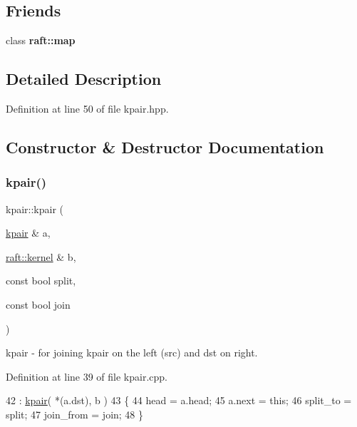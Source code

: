 \subsection*{Friends}
\begin{DoxyCompactItemize}
\item 
\hypertarget{classkpair_aa25a3986fa3c9242f434168844d4ddfb}{}\label{classkpair_aa25a3986fa3c9242f434168844d4ddfb} 
class {\bfseries raft\+::map}
\end{DoxyCompactItemize}


\subsection{Detailed Description}


Definition at line 50 of file kpair.\+hpp.



\subsection{Constructor \& Destructor Documentation}
\hypertarget{classkpair_a5a1866af1277df07ee28df5e87a91b24}{}\label{classkpair_a5a1866af1277df07ee28df5e87a91b24} 
\subsubsection{\texorpdfstring{kpair()}{kpair()}\hspace{0.1cm}{\footnotesize\ttfamily [1/3]}}
{\footnotesize\ttfamily kpair\+::kpair (\begin{DoxyParamCaption}\item[{\hyperlink{classkpair}{kpair} \&}]{a,  }\item[{\hyperlink{classraft_1_1kernel}{raft\+::kernel} \&}]{b,  }\item[{const bool}]{split,  }\item[{const bool}]{join }\end{DoxyParamCaption})}

kpair -\/ for joining kpair on the left (src) and dst on right. 

Definition at line 39 of file kpair.\+cpp.


\begin{DoxyCode}
42                                 : \hyperlink{classkpair}{kpair}( *(a.dst), b )
43 \{
44     head        = a.head;
45     a.next  = \textcolor{keyword}{this};
46     split\_to    = split;
47     join\_from   = join;
48 \}
\end{DoxyCode}
\hypertarget{classkpair_a05880ad7b01ca52580a80d30170c5f38}{}\label{classkpair_a05880ad7b01ca52580a80d30170c5f38} 
